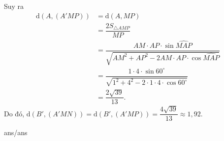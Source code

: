 \begin{ex}
{		Suy ra 
		\allowdisplaybreaks
		\begin{align*} 
			\mathrm{d}\left(A,\left(A'MP\right)\right)&=\mathrm{d}(A,MP)  \\ 
			&=\dfrac{2S_{\triangle AMP}}{MP}  \\ 
			&=\dfrac{AM\cdot AP\cdot \sin\widehat{MAP}}{\sqrt{AM^2+AP^2-2AM\cdot AP\cdot\cos\widehat{MAP}}}  \\ 
			&=\dfrac{1 \cdot 4\cdot \sin 60^\circ}{\sqrt{1^2+4^2-2\cdot 1\cdot 4\cdot\cos 60^\circ}}  \\ 
			&=\dfrac{2\sqrt{39}}{13}.
		\end{align*}
		Do đó, $\mathrm{d}\left(B',\left(A'MN\right)\right)=\mathrm{d}\left(B',\left(A'MP\right)\right)=\dfrac{4\sqrt{39}}{13}\approx 1{,}92$.
	}
\end{ex}

\begin{indapan}
	{ans/ans\currfilebase}
\end{indapan}